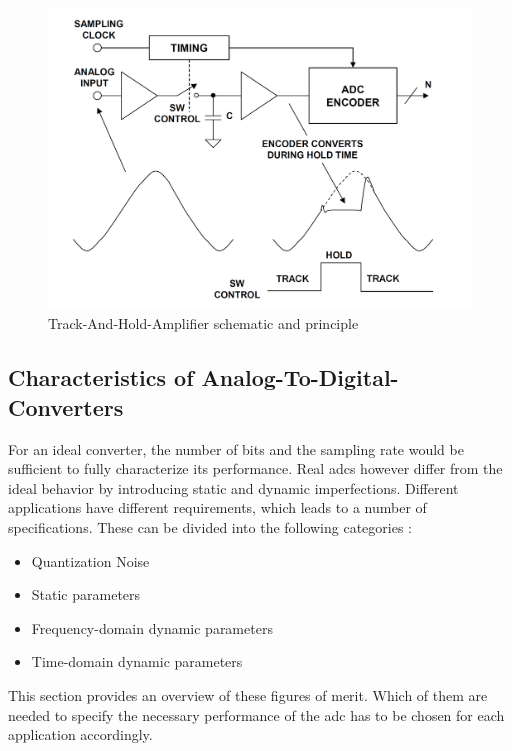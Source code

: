 \begin{figure}[tbh]
	\centering
	\includegraphics[width = \textwidth]{chap/02-theory/img/tha}
	\caption{Track-And-Hold-Amplifier schematic and principle \cite{walt}}
	\label{fig:tha}
\end{figure}

\subsection*{Characteristics of Analog-To-Digital-Converters} 
For an ideal converter, the number of bits and the sampling rate would be sufficient to fully characterize its performance.
Real \glspl{adc} however differ from the ideal behavior by introducing static and dynamic imperfections.
Different applications have different requirements, which leads to a number of specifications.
These can be divided into the following categories \cite{Lundberg}:
\begin{itemize}[noitemsep]
	\item Quantization Noise
	\item Static parameters
	\item Frequency-domain dynamic parameters
	\item Time-domain dynamic parameters
\end{itemize}
This section provides an overview of these figures of merit.
Which of them are needed to specify the necessary performance of the \gls{adc} has to be chosen for each application accordingly.

